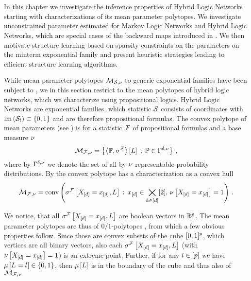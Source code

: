 \chapter{\chatextnetworkReasoning}\label{cha:networkReasoning}

In this chapter we investigate the inference properties of Hybrid Logic Networks starting with characterizations of its mean parameter polytopes.
We investigate unconstrained parameter estimated for Markov Logic Networks and Hybrid Logic Networks, which are special cases of the backward maps introduced in .
We then motivate structure learning based on sparsity constraints on the parameters on the minterm exponential family and present heuristic strategies leading to efficient structure learning algorithms.


While mean parameter polytopes $\mathcal{M}_{\mathcal{S},\nu}$ to generic exponential families have been subject to , we in this section restrict to the mean polytopes of hybrid logic networks, which we characterize using propositional logics.
Hybrid Logic Networks are exponential families, which statistic $\mathcal{S}$ consists of coordinates with $\mathrm{im}\left(\mathcal{S}_{l}\right)\subset\{0,1\}$ and are therefore propositional formulas.
The convex polytope of mean parameters (see ) is for a statistic $\mathcal{F}$ of propositional formulas and a base measure $\nu$
\begin{align*}
	\mathcal{M}_{\mathcal{F},\nu} = \left\{ \left\langle \mathbb{P},\sigma^{\mathcal{F}}\right\rangle \left[ L \right] \, : \, \mathbb{P}\in\Gamma^{\delta,\nu} \right\} \, ,
\end{align*}
where by $\Gamma^{\delta,\nu}$ we denote the set of all by $\nu$ representable probability distributions.
By  the convex polytope has a characterization as a convex hull
\begin{align}\label{eq:hlnMeansetConvCharacterization}
	\mathcal{M}_{\mathcal{F},\nu}
	= \mathrm{conv}\left(\sigma^{\mathcal{F}}\left[X_{[d]}=x_{[d]},L\right] \, : \, x_{[d]}\in\bigtimes_{k\in[d]}[2], \, \nu\left[X_{[d]}=x_{[d]}\right]=1\right) \, .
\end{align}

We notice, that all $\sigma^{\mathcal{F}}\left[X_{[d]}=x_{[d]},L\right]$ are boolean vectors in $\mathbb{R}^{p}$.
The mean parameter polytopes are thus of $0/1$-polytopes \cite{ziegler_lectures_2000,gillmann_01-polytopes_2007}, from which a few obvious properties follow.
Since those are convex subsets of the cube $[0,1]^p$, which vertices are all binary vectors, also each $\sigma^{\mathcal{F}}\left[X_{[d]}=x_{[d]},L\right]$ (with $\nu\left[X_{[d]}=x_{[d]}\right]=1$) is an extreme point.
Further, if for any $l\in[p]$ we have $\mu\left[L_{}=l_{}\right]\in\{0,1\}$, then $\mu\left[L\right]$ is in the boundary of the cube and thus also of $\mathcal{M}_{\mathcal{F},\nu}$

